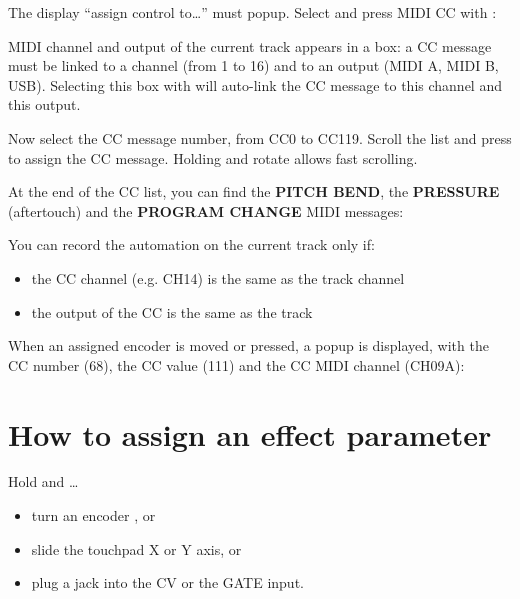 The display ``assign control to\ldots'' must popup. Select and press MIDI CC with \encodericon{}:


MIDI channel and output of the current track appears in a box: a CC message must be linked to a channel (from 1 to 16) and to an output (MIDI A, MIDI B, USB). Selecting this box with \encodericon{} will auto-link the CC message to this channel and this output.


Now select the CC message number, from CC0 to CC119. Scroll the list and press \encodericon{} to assign the CC message. Holding  and rotate \encodericon{} allows fast scrolling.


At the end of the CC list, you can find the \textbf{PITCH BEND}, the \textbf{PRESSURE} (aftertouch) and the \textbf{PROGRAM CHANGE} MIDI messages:


You can record the automation on the current track only if:
\begin{itemize}
\item the CC channel (e.g. CH14) is the same as the track channel
\item the output of the CC is the same as the track
\end{itemize}


When an assigned encoder is moved or pressed, a popup is displayed, with the CC number (68), the CC value (111) and the CC MIDI channel (CH09A):


\section{How to assign an effect parameter}

Hold  and \ldots

\begin{itemize}
\item turn an encoder \encodersicon{}, or
\item slide the touchpad \touchpadicon{} X or Y axis, or
\item plug a jack into the CV or the GATE input.
\end{itemize}

